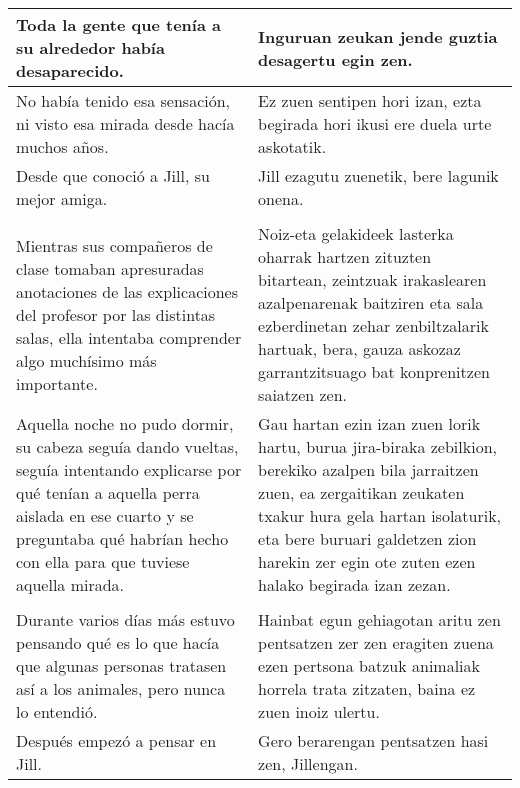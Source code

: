 \documentclass{article}
\begin{document}
\begin{center}
\begin{longtable}{|p{6cm}|p{6cm}|}
  \midrule
  Toda la gente que tenía a su alrededor había desaparecido.&
  Inguruan zeukan jende guztia desagertu egin zen.\\

  \midrule
  No había tenido esa sensación, ni visto esa mirada desde hacía muchos años.&
  Ez zuen sentipen hori izan, ezta begirada hori ikusi ere duela urte askotatik.\\

  \midrule
  Desde que conoció a Jill, su mejor amiga.&
  Jill ezagutu zuenetik, bere lagunik onena.\\

  \midrule
  \cellcolor{lightgray}{\textbf{Párrafo}} &
  \cellcolor{lightgray}{\textbf{Paragrafoa}}\\
  
  \midrule
  Mientras sus compañeros de clase tomaban apresuradas anotaciones de las explicaciones del profesor por las distintas salas, ella intentaba comprender algo muchísimo más importante.&
  Noiz-eta gelakideek lasterka oharrak hartzen zituzten bitartean, zeintzuak irakaslearen azalpenarenak baitziren eta sala ezberdinetan zehar zenbiltzalarik hartuak, bera, gauza askozaz garrantzitsuago bat konprenitzen saiatzen zen.\\

  \midrule
  Aquella noche no pudo dormir, su cabeza seguía dando vueltas, seguía intentando explicarse por qué tenían a aquella perra aislada en ese cuarto y se preguntaba qué habrían hecho con ella para que tuviese aquella mirada.&
  Gau hartan ezin izan zuen lorik hartu, burua jira-biraka zebilkion, berekiko azalpen bila jarraitzen zuen, ea zergaitikan zeukaten txakur hura gela hartan isolaturik, eta bere buruari galdetzen zion harekin zer egin ote zuten ezen halako begirada izan zezan.\\

  \midrule
  \cellcolor{lightgray}{\textbf{Párrafo}} &
  \cellcolor{lightgray}{\textbf{Paragrafoa}}\\
  
  \midrule
  Durante varios días más estuvo pensando qué es lo que hacía que algunas personas tratasen así a los animales, pero nunca lo entendió.&
  Hainbat egun gehiagotan aritu zen pentsatzen zer zen eragiten zuena ezen pertsona batzuk animaliak horrela trata zitzaten, baina ez zuen inoiz ulertu.\\

  \midrule
  Después empezó a pensar en Jill.&
  Gero berarengan pentsatzen hasi zen, Jillengan.\\


\end{longtable}
\end{center}
\end{document}
